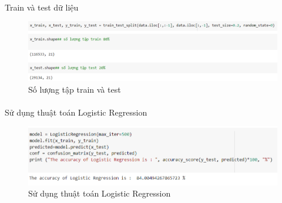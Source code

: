 \documentclass{article}
\begin{document}
\paragraph{}\paragraph{}\paragraph{}\paragraph{}\paragraph{}Train và test dữ liệu
\begin{figure}[!h]
	\begin{center}
		\includegraphics[width=\linewidth]{images/code35.png}
		\caption{\fontsize{14}{20}\selectfont Số lượng tập train và test}
	\end{center}
\end{figure}

\paragraph{}\paragraph{}\paragraph{}Sử dụng thuật toán Logistic Regression
\begin{figure}[!h]
	\begin{center}
		\includegraphics[width=\linewidth]{images/code29.png}
		\caption{\fontsize{14}{20}\selectfont Sử dụng thuật toán Logistic Regression}
	\end{center}
\end{figure}
\end{document}

